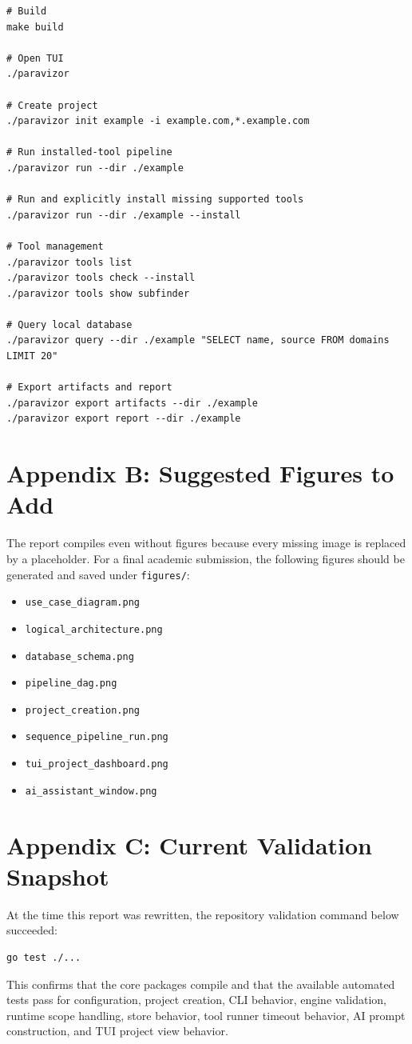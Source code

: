 \documentclass[a4paper,12pt]{article}
\begin{document}
\begin{lstlisting}[style=bashstyle]
# Build
make build

# Open TUI
./paravizor

# Create project
./paravizor init example -i example.com,*.example.com

# Run installed-tool pipeline
./paravizor run --dir ./example

# Run and explicitly install missing supported tools
./paravizor run --dir ./example --install

# Tool management
./paravizor tools list
./paravizor tools check --install
./paravizor tools show subfinder

# Query local database
./paravizor query --dir ./example "SELECT name, source FROM domains LIMIT 20"

# Export artifacts and report
./paravizor export artifacts --dir ./example
./paravizor export report --dir ./example
\end{lstlisting}

\section{Appendix B: Suggested Figures to Add}

The report compiles even without figures because every missing image is replaced by a placeholder. For a final academic submission, the following figures should be generated and saved under \texttt{figures/}:

\begin{itemize}
    \item \texttt{use\_case\_diagram.png}
    \item \texttt{logical\_architecture.png}
    \item \texttt{database\_schema.png}
    \item \texttt{pipeline\_dag.png}
    \item \texttt{project\_creation.png}
    \item \texttt{sequence\_pipeline\_run.png}
    \item \texttt{tui\_project\_dashboard.png}
    \item \texttt{ai\_assistant\_window.png}
\end{itemize}

\section{Appendix C: Current Validation Snapshot}

At the time this report was rewritten, the repository validation command below succeeded:

\begin{lstlisting}[style=bashstyle]
go test ./...
\end{lstlisting}

This confirms that the core packages compile and that the available automated tests pass for configuration, project creation, CLI behavior, engine validation, runtime scope handling, store behavior, tool runner timeout behavior, AI prompt construction, and TUI project view behavior.
\end{document}
